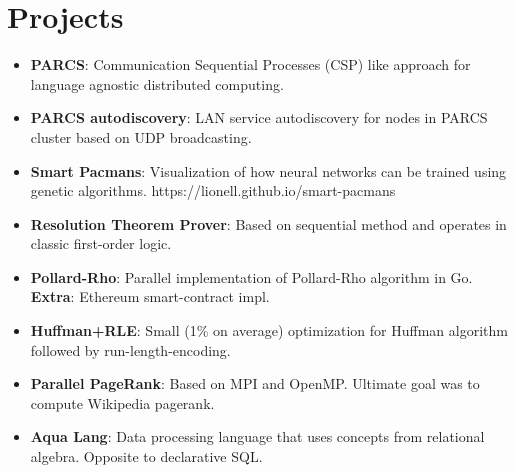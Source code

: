 \documentclass[letterpaper,11pt]{article}
\newcommand{\resumeSubItem}[2]{
  \item\small{
    \textbf{#1}{: #2 \vspace{-2pt}}
  }
}
\newcommand{\resumeSubHeadingListStart}{\begin{itemize}[leftmargin=*]}
\newcommand{\resumeSubHeadingListEnd}{\end{itemize}}
\begin{document}
\section{Projects}
  \resumeSubHeadingListStart
    \resumeSubItem{PARCS}
      {Communication Sequential Processes (CSP) like approach for language agnostic distributed computing.}
    \resumeSubItem{PARCS autodiscovery}
      {LAN service autodiscovery for nodes in PARCS cluster based on UDP broadcasting.}
    \resumeSubItem{Smart Pacmans}
      {Visualization of how neural networks can be trained using genetic algorithms. https://lionell.github.io/smart-pacmans}
    \resumeSubItem{Resolution Theorem Prover}
      {Based on sequential method and operates in classic first-order logic.}
    \resumeSubItem{Pollard-Rho}
      {Parallel implementation of Pollard-Rho algorithm in Go. \textbf{Extra}: Ethereum smart-contract impl.}
    \resumeSubItem{Huffman+RLE}
      {Small (1\% on average) optimization for Huffman algorithm followed by run-length-encoding.}
    \resumeSubItem{Parallel PageRank}
      {Based on MPI and OpenMP. Ultimate goal was to compute Wikipedia pagerank.}
    \resumeSubItem{Aqua Lang}
      {Data processing language that uses concepts from relational algebra. Opposite to declarative SQL.}
  \resumeSubHeadingListEnd


%


\end{document}
